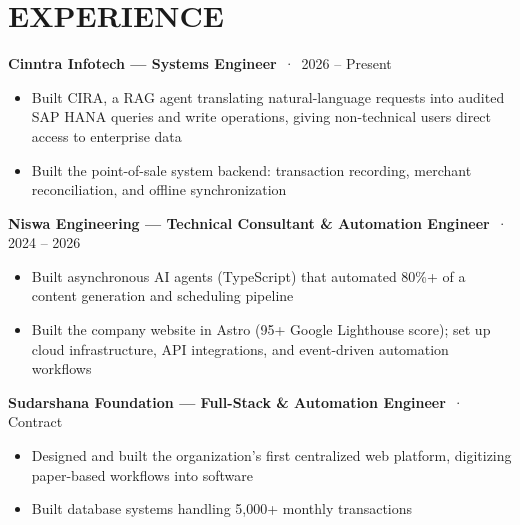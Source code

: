 \documentclass[9pt]{article}
\begin{document}
\section*{EXPERIENCE}
\textbf{Cinntra Infotech  ---  Systems Engineer} \,·\, 2026 – Present
\vspace{1pt}
\begin{itemize}[leftmargin=11pt,itemsep=0pt,topsep=1pt,parsep=0pt]
\item Built CIRA, a RAG agent translating natural-language requests into audited SAP HANA queries and write operations, giving non-technical users direct access to enterprise data
\item Built the point-of-sale system backend: transaction recording, merchant reconciliation, and offline synchronization
\end{itemize}
\textbf{Niswa Engineering  ---  Technical Consultant \& Automation Engineer} \,·\, 2024 – 2026
\vspace{1pt}
\begin{itemize}[leftmargin=11pt,itemsep=0pt,topsep=1pt,parsep=0pt]
\item Built asynchronous AI agents (TypeScript) that automated 80\%+ of a content generation and scheduling pipeline
\item Built the company website in Astro (95+ Google Lighthouse score); set up cloud infrastructure, API integrations, and event-driven automation workflows
\end{itemize}
\textbf{Sudarshana Foundation  ---  Full-Stack \& Automation Engineer} \,·\, Contract
\vspace{1pt}
\begin{itemize}[leftmargin=11pt,itemsep=0pt,topsep=1pt,parsep=0pt]
\item Designed and built the organization's first centralized web platform, digitizing paper-based workflows into software
\item Built database systems handling 5,000+ monthly transactions
\end{itemize}
\end{document}
